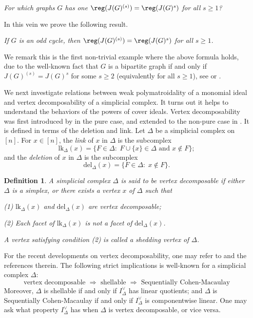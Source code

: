 \documentclass[12pt]{amsart}
\let\:=\colon
\newtheorem{Definition}[Theorem]{Definition}
\begin{document}
\begin{center} {\it For which graphs $G$ has one   $\reg(J(G)^{(s)})=\reg(J(G)^{s})$  for all $s\geq 1$?}
\end{center}



   In this vein we prove the following result.

\vspace{1.5mm}
    {\it If $G$ is an odd cycle, then $\reg(J(G)^{(s)})=\reg(J(G)^{s})$ for all $s\geq 1$.}
   \vspace{1.5mm}

  We remark this  is the first non-trivial example where  the above formula holds, due to the well-known fact that  $G$ is a bipartite graph if and only if  $J(G)^{(s)}=J(G)^s$ for some $s\geq 2$ (equivalently for all $s\geq 1$), see \cite[Proposition 1.3]{TT} or  \cite[Theorem 5.1]{HHT}.

\vspace{3mm}
 We next  investigate  relations between weak polymatroidality of a monomial ideal and vertex decomposability of a simplicial complex. It turns out it helps to understand the  behaviors of the powers of cover ideals. Vertex decomposability  was first introduced by \cite{PB} in
the pure case, and extended to the non-pure case in \cite{BW}.
It is defined in terms of the deletion and link. Let $\Delta$ be a simplicial complex on $[n]$.  For  $x\in [n]$, the {\it link} of $x$ in $\Delta$  is the subcomplex $$\mbox{lk}_{\Delta}(x)=\{F\in \Delta\:\; F\cup \{x\}\in \Delta \mbox{ and } x\notin F\};$$ and the {\it deletion}  of $x$ in $\Delta$  is the subcomplex $$\mbox{del}_{\Delta}(x)=\{F\in \Delta\:\;  x\notin F\}.$$
\begin{Definition}\em  A simplicial complex  $\Delta$ is said to be {\it vertex decomposable} if either $\Delta$ is a simplex, or  there exists a vertex $x$ of $\Delta$ such that

(1) $\mbox{lk}_{\Delta}(x)$ and $\mbox{del}_{\Delta}(x)$ are vertex decomposable;

(2) Each facet of $\mbox{lk}_{\Delta}(x)$ is not a facet of $\mbox{del}_{\Delta}(x)$.

A vertex satisfying condition (2) is called a {\it shedding vertex} of $\Delta$.
\end{Definition}

For the recent developments on vertex decomposability,  one may refer to \cite{GLW} and the references therein. The following strict implications is well-known for a  simplicial complex $\Delta$:
$$ \mbox{vertex decomposable }\Longrightarrow  \mbox{  shellable }\Longrightarrow   \mbox{  Sequentially Cohen-Macaulay}$$
Moreover, $\Delta$  is shellable if and only if $I_{\Delta}^{\vee}$ has linear quotients; and $\Delta$  is Sequentially Cohen-Macaulay if and only if $I_{\Delta}^{\vee}$ is componentwise linear.  One may ask what property $I_{\Delta}^{\vee}$ has when $\Delta$ is  vertex decomposable, or vice versa.
\end{document}
